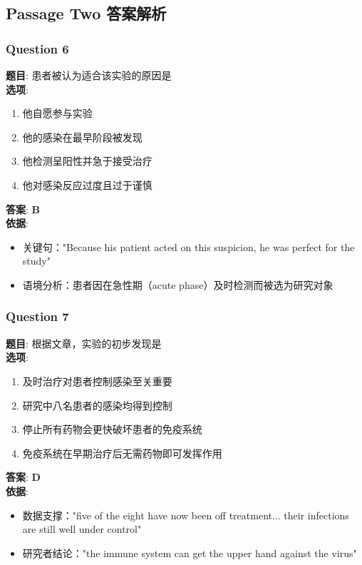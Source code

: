 \documentclass{article}
\begin{document}
\subsection*{Passage Two 答案解析}

\subsubsection*{Question 6}
\textbf{题目}: 患者被认为适合该实验的原因是 \\
\textbf{选项}: 
\begin{enumerate}[label=\Alph*)]
    \item 他自愿参与实验
    \item 他的感染在最早阶段被发现
    \item 他检测呈阳性并急于接受治疗
    \item 他对感染反应过度且过于谨慎
\end{enumerate}
\textbf{答案}: \textbf{B} \\
\textbf{依据}:
\begin{itemize}
    \item 关键句："Because his patient acted on this suspicion, he was perfect for the study"
    \item 语境分析：患者因在急性期（acute phase）及时检测而被选为研究对象
\end{itemize}

\subsubsection*{Question 7}
\textbf{题目}: 根据文章，实验的初步发现是 \\
\textbf{选项}: 
\begin{enumerate}[label=\Alph*)]
    \item 及时治疗对患者控制感染至关重要
    \item 研究中八名患者的感染均得到控制
    \item 停止所有药物会更快破坏患者的免疫系统
    \item 免疫系统在早期治疗后无需药物即可发挥作用
\end{enumerate}
\textbf{答案}: \textbf{D} \\
\textbf{依据}:
\begin{itemize}
    \item 数据支撑："five of the eight have now been off treatment... their infections are still well under control"
    \item 研究者结论："the immune system can get the upper hand against the virus"
\end{itemize}
\end{document}
